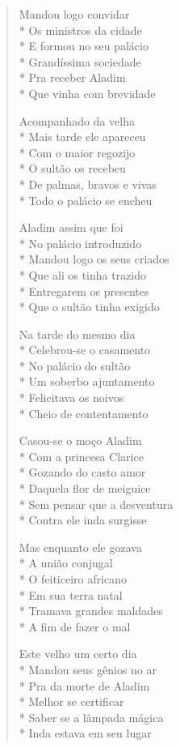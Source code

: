 \begin{verse}
Mandou logo convidar\\*
Os ministros da cidade\\*
E formou no seu palácio\\*
Grandíssima sociedade\\*
Pra receber Aladim\\*
Que vinha com brevidade

Acompanhado da velha\\*
Mais tarde ele apareceu\\*
Com o maior regozijo\\*
O sultão os recebeu\\*
De palmas, bravos e vivas\\*
Todo o palácio se encheu

Aladim assim que foi\\*
No palácio introduzido\\*
Mandou logo os seus criados\\*
Que ali os tinha trazido\\*
Entregarem os presentes\\*
Que o sultão tinha exigido

Na tarde do mesmo dia\\*
Celebrou-se o casamento\\*
No palácio do sultão\\*
Um soberbo ajuntamento\\*
Felicitava os noivos\\*
Cheio de contentamento

Casou-se o moço Aladim\\*
Com a princesa Clarice\\*
Gozando do casto amor\\*
Daquela flor de meiguice\\*
Sem pensar que a desventura\\*
Contra ele inda surgisse

Mas enquanto ele gozava\\*
A união conjugal\\*
O feiticeiro africano\\*
Em sua terra natal\\*
Tramava grandes maldades\\*
A fim de fazer o mal

Este velho um certo dia\\*
Mandou seus gênios no ar\\*
Pra da morte de Aladim\\*
Melhor se certificar\\*
Saber se a lâmpada mágica\\*
Inda estava em seu lugar


\end{verse}

